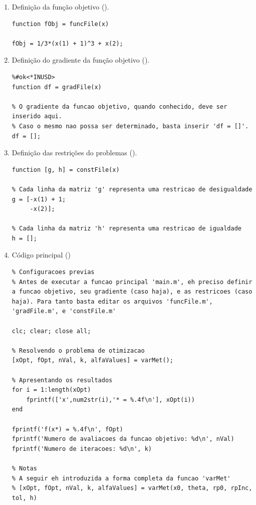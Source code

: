 \documentclass[12pt]{article}
\begin{document}
 		\begin{enumerate}
 			\item Definição da função objetivo ().
 			\begin{lstlisting}
function fObj = funcFile(x)

fObj = 1/3*(x(1) + 1)^3 + x(2);
 			\end{lstlisting}
 				
 			\item Definição do gradiente da função objetivo ().
 			\begin{lstlisting}
%#ok<*INUSD>
function df = gradFile(x)

% O gradiente da funcao objetivo, quando conhecido, deve ser inserido aqui.
% Caso o mesmo nao possa ser determinado, basta inserir 'df = []'.
df = [];
 			\end{lstlisting}
 			
 			\item Definição das restrições do problemas ().
 			\begin{lstlisting}
function [g, h] = constFile(x)

% Cada linha da matriz 'g' representa uma restricao de desigualdade
g = [-x(1) + 1;
     -x(2)];

% Cada linha da matriz 'h' representa uma restricao de igualdade
h = [];
 			\end{lstlisting}
 			
 			\item Código principal ()
 			\begin{lstlisting}
% Configuracoes previas 
% Antes de executar a funcao principal 'main.m', eh preciso definir a funcao objetivo, seu gradiente (caso haja), e as restricoes (caso haja). Para tanto basta editar os arquivos 'funcFile.m', 'gradFile.m', e 'constFile.m'

clc; clear; close all;

% Resolvendo o problema de otimizacao
[xOpt, fOpt, nVal, k, alfaValues] = varMet();

% Apresentando os resultados 
for i = 1:length(xOpt)
	fprintf(['x',num2str(i),'* = %.4f\n'], xOpt(i))
end

fprintf('f(x*) = %.4f\n', fOpt)
fprintf('Numero de avaliacoes da funcao objetivo: %d\n', nVal)
fprintf('Numero de iteracoes: %d\n', k)

% Notas 
% A seguir eh introduzida a forma completa da funcao 'varMet'
% [xOpt, fOpt, nVal, k, alfaValues] = varMet(x0, theta, rp0, rpInc, tol, h)


\end{lstlisting}
\end{enumerate}
\end{document}
